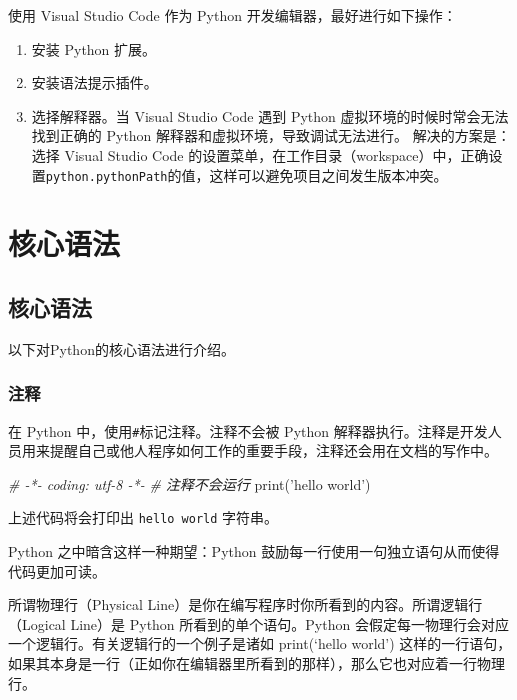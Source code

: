 \documentclass[]{ctexbook}
\newenvironment{Shaded}{\begin{snugshade}}{\end{snugshade}}
\newcommand{\BuiltInTok}[1]{#1}
\newcommand{\CommentTok}[1]{\textcolor[rgb]{0.56,0.35,0.01}{\textit{#1}}}
\newcommand{\NormalTok}[1]{#1}
\newcommand{\StringTok}[1]{\textcolor[rgb]{0.31,0.60,0.02}{#1}}
\providecommand{\tightlist}{%
  \setlength{\itemsep}{0pt}\setlength{\parskip}{0pt}}
\begin{document}
使用 Visual Studio Code 作为 Python 开发编辑器，最好进行如下操作：

\begin{enumerate}
\def\labelenumi{\arabic{enumi}.}
\tightlist
\item
  安装 Python 扩展。
\item
  安装语法提示插件。
\item
  选择解释器。当 Visual Studio Code 遇到 Python 虚拟环境的时候时常会无法找到正确的 Python 解释器和虚拟环境，导致调试无法进行。
  解决的方案是：选择 Visual Studio Code 的设置菜单，在工作目录（workspace）中，正确设置\texttt{python.pythonPath}的值，这样可以避免项目之间发生版本冲突。
\end{enumerate}

\hypertarget{part-ux6838ux5fc3ux8bedux6cd5}{%
\part{核心语法}\label{part-ux6838ux5fc3ux8bedux6cd5}}

\hypertarget{systax}{%
\chapter{核心语法}\label{systax}}

以下对Python的核心语法进行介绍。

\hypertarget{ux6ce8ux91ca}{%
\section{注释}\label{ux6ce8ux91ca}}

在 Python 中，使用\texttt{\#}标记注释。注释不会被 Python 解释器执行。注释是开发人员用来提醒自己或他人程序如何工作的重要手段，注释还会用在文档的写作中。

\begin{Shaded}
\begin{Highlighting}[]
\CommentTok{# -*- coding: utf-8 -*-}
\CommentTok{# 注释不会运行}
\BuiltInTok{print}\NormalTok{(}\StringTok{'hello world'}\NormalTok{)}
\end{Highlighting}
\end{Shaded}

上述代码将会打印出 \texttt{hello\ world} 字符串。

Python 之中暗含这样一种期望：Python 鼓励每一行使用一句独立语句从而使得代码更加可读。

所谓物理行（Physical Line）是你在编写程序时你所看到的内容。所谓逻辑行（Logical Line）是 Python 所看到的单个语句。Python 会假定每一物理行会对应一个逻辑行。有关逻辑行的一个例子是诸如 print(`hello world') 这样的一行语句，如果其本身是一行（正如你在编辑器里所看到的那样），那么它也对应着一行物理行。
\end{document}
